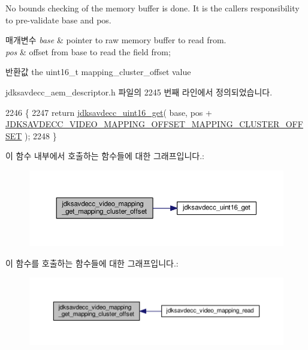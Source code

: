 No bounds checking of the memory buffer is done. It is the caller\textquotesingle{}s responsibility to pre-\/validate base and pos.


\begin{DoxyParams}{매개변수}
{\em base} & pointer to raw memory buffer to read from. \\
\hline
{\em pos} & offset from base to read the field from; \\
\hline
\end{DoxyParams}
\begin{DoxyReturn}{반환값}
the uint16\+\_\+t mapping\+\_\+cluster\+\_\+offset value 
\end{DoxyReturn}


jdksavdecc\+\_\+aem\+\_\+descriptor.\+h 파일의 2245 번째 라인에서 정의되었습니다.


\begin{DoxyCode}
2246 \{
2247     \textcolor{keywordflow}{return} \hyperlink{group__endian_ga3fbbbc20be954aa61e039872965b0dc9}{jdksavdecc\_uint16\_get}( base, pos + 
      \hyperlink{group__video__mapping_gaf8730c34ed728d0be2bd774fddea75d3}{JDKSAVDECC\_VIDEO\_MAPPING\_OFFSET\_MAPPING\_CLUSTER\_OFFSET}
       );
2248 \}
\end{DoxyCode}


이 함수 내부에서 호출하는 함수들에 대한 그래프입니다.\+:
\nopagebreak
\begin{figure}[H]
\begin{center}
\leavevmode
\includegraphics[width=350pt]{group__video__mapping_ga4b598d018e5df68bd8f2d989a45d780a_cgraph}
\end{center}
\end{figure}




이 함수를 호출하는 함수들에 대한 그래프입니다.\+:
\nopagebreak
\begin{figure}[H]
\begin{center}
\leavevmode
\includegraphics[width=350pt]{group__video__mapping_ga4b598d018e5df68bd8f2d989a45d780a_icgraph}
\end{center}
\end{figure}


